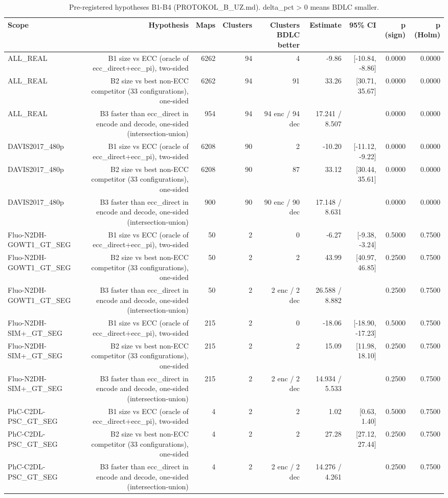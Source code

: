 \begin{table}[t]
\centering
\caption{Pre-registered hypotheses B1-B4 (PROTOKOL\_B\_UZ.md). delta\_pct > 0 means BDLC smaller.}
\begin{tabular}{lrrrrrrrr}
\hline
Scope & Hypothesis & Maps & Clusters & Clusters BDLC better & Estimate & 95\% CI & p (sign) & p (Holm) \\
\hline
ALL\_REAL & B1 size vs ECC (oracle of ecc\_direct+ecc\_pi), two-sided & 6262 & 94 & 4 & -9.86 & [-10.84, -8.86] & 0.0000 & 0.0000 \\
ALL\_REAL & B2 size vs best non-ECC competitor (33 configurations), one-sided & 6262 & 94 & 91 & 33.26 & [30.71, 35.67] & 0.0000 & 0.0000 \\
ALL\_REAL & B3 faster than ecc\_direct in encode and decode, one-sided (intersection-union) & 954 & 94 & 94 enc / 94 dec & 17.241 / 8.507 &  & 0.0000 & 0.0000 \\
DAVIS2017\_480p & B1 size vs ECC (oracle of ecc\_direct+ecc\_pi), two-sided & 6208 & 90 & 2 & -10.20 & [-11.12, -9.22] & 0.0000 & 0.0000 \\
DAVIS2017\_480p & B2 size vs best non-ECC competitor (33 configurations), one-sided & 6208 & 90 & 87 & 33.12 & [30.44, 35.61] & 0.0000 & 0.0000 \\
DAVIS2017\_480p & B3 faster than ecc\_direct in encode and decode, one-sided (intersection-union) & 900 & 90 & 90 enc / 90 dec & 17.148 / 8.631 &  & 0.0000 & 0.0000 \\
Fluo-N2DH-GOWT1\_GT\_SEG & B1 size vs ECC (oracle of ecc\_direct+ecc\_pi), two-sided & 50 & 2 & 0 & -6.27 & [-9.38, -3.24] & 0.5000 & 0.7500 \\
Fluo-N2DH-GOWT1\_GT\_SEG & B2 size vs best non-ECC competitor (33 configurations), one-sided & 50 & 2 & 2 & 43.99 & [40.97, 46.85] & 0.2500 & 0.7500 \\
Fluo-N2DH-GOWT1\_GT\_SEG & B3 faster than ecc\_direct in encode and decode, one-sided (intersection-union) & 50 & 2 & 2 enc / 2 dec & 26.588 / 8.882 &  & 0.2500 & 0.7500 \\
Fluo-N2DH-SIM+\_GT\_SEG & B1 size vs ECC (oracle of ecc\_direct+ecc\_pi), two-sided & 215 & 2 & 0 & -18.06 & [-18.90, -17.23] & 0.5000 & 0.7500 \\
Fluo-N2DH-SIM+\_GT\_SEG & B2 size vs best non-ECC competitor (33 configurations), one-sided & 215 & 2 & 2 & 15.09 & [11.98, 18.10] & 0.2500 & 0.7500 \\
Fluo-N2DH-SIM+\_GT\_SEG & B3 faster than ecc\_direct in encode and decode, one-sided (intersection-union) & 215 & 2 & 2 enc / 2 dec & 14.934 / 5.533 &  & 0.2500 & 0.7500 \\
PhC-C2DL-PSC\_GT\_SEG & B1 size vs ECC (oracle of ecc\_direct+ecc\_pi), two-sided & 4 & 2 & 2 & 1.02 & [0.63, 1.40] & 0.5000 & 0.7500 \\
PhC-C2DL-PSC\_GT\_SEG & B2 size vs best non-ECC competitor (33 configurations), one-sided & 4 & 2 & 2 & 27.28 & [27.12, 27.44] & 0.2500 & 0.7500 \\
PhC-C2DL-PSC\_GT\_SEG & B3 faster than ecc\_direct in encode and decode, one-sided (intersection-union) & 4 & 2 & 2 enc / 2 dec & 14.276 / 4.261 &  & 0.2500 & 0.7500 \\
\hline
\end{tabular}
\end{table}
